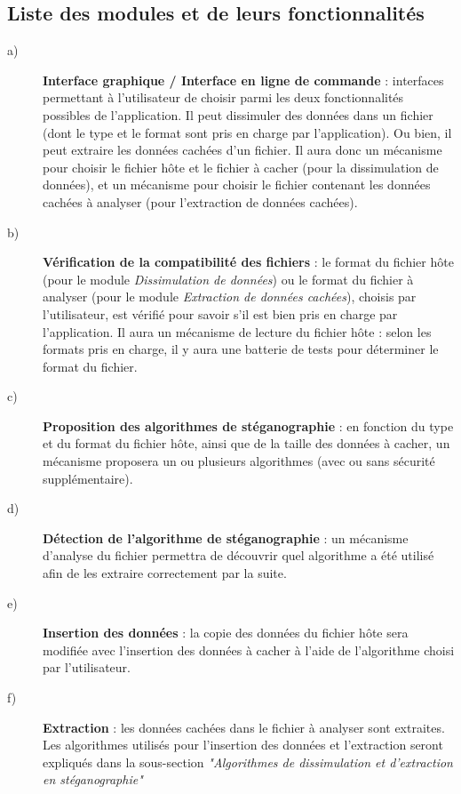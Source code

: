 \documentclass[11pt]{article}
\begin{document}
\subsection{Liste des modules et de leurs fonctionnalités}

\begin{description}
\item[a)] \textbf{Interface graphique / Interface en ligne de commande} :
    interfaces permettant à l'utilisateur de choisir parmi les deux
    fonctionnalités possibles de l'application. Il peut dissimuler des
    données dans un fichier (dont le type et le format sont pris en charge
    par l'application). Ou bien, il peut extraire les données cachées d'un
    fichier. \newline
    Il aura donc un mécanisme pour choisir le fichier hôte et le fichier 
    à cacher (pour la dissimulation de données), et un mécanisme pour choisir le 
    fichier contenant les données cachées à analyser (pour l'extraction de 
    données cachées). 
    

\item[b)] \textbf{Vérification de la compatibilité des fichiers} : le format 
	du fichier hôte (pour le module \textit{Dissimulation de données}) ou 
	le format du fichier à analyser (pour le module \textit{Extraction de données 
	cachées}), choisis par l'utilisateur, est vérifié pour savoir s'il est 
	bien pris en charge par l'application. \newline
	Il aura un mécanisme de lecture du fichier hôte : selon les formats 
	pris en charge, il y aura une batterie de tests pour déterminer le 
	format du fichier. 

\item[c)] \textbf{Proposition des algorithmes de stéganographie} : en fonction
    du type et du format du fichier hôte, ainsi que de la taille des données à
    cacher, un mécanisme proposera un ou plusieurs algorithmes (avec ou sans 
    sécurité supplémentaire). 

\item[d)] \textbf{Détection de l'algorithme de stéganographie} : un mécanisme 
	d'analyse du fichier permettra de découvrir quel algorithme a été utilisé 
	afin de les extraire correctement par la suite. 

\item[e)] \textbf{Insertion des données} : la copie des données du fichier hôte
    sera modifiée avec l'insertion des données à cacher à l'aide de l'algorithme
    choisi par l'utilisateur. 

\item[f)] \textbf{Extraction} : les données cachées dans le fichier à analyser
    sont extraites. Les algorithmes utilisés pour l'insertion des données 
    et l'extraction seront expliqués dans la sous-section \textit{"Algorithmes 
    de dissimulation et d'extraction en stéganographie"}

\end{description}
\end{document}
